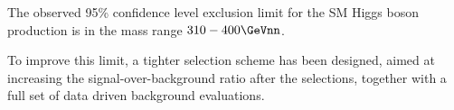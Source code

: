 The observed 95\% confidence level exclusion limit for the SM Higgs boson production is in the mass range $310-400\GeVnn$.

To improve this limit, a tighter selection scheme has been designed, aimed at increasing the
signal-over-background ratio after the selections, together with a full set of data driven
background evaluations.
